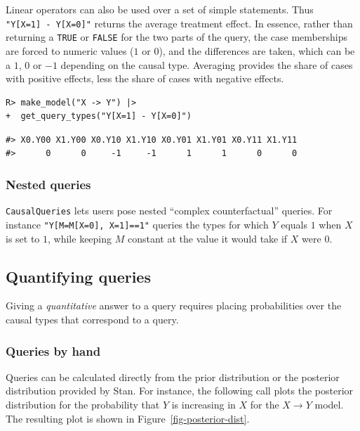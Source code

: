 \documentclass[
  11pt,
  article]{jss}
\begin{document}
Linear operators can also be used over a set of simple statements. Thus
\texttt{"Y{[}X=1{]}\ -\ Y{[}X=0{]}"} returns the average treatment
effect. In essence, rather than returning a \texttt{TRUE} or
\texttt{FALSE} for the two parts of the query, the case memberships are
forced to numeric values (\(1\) or \(0\)), and the differences are
taken, which can be a \(1\), \(0\) or \(-1\) depending on the causal
type. Averaging provides the share of cases with positive effects, less
the share of cases with negative effects.

\begin{verbatim}
R> make_model("X -> Y") |> 
+  get_query_types("Y[X=1] - Y[X=0]")
\end{verbatim}

\begin{verbatim}
#> X0.Y00 X1.Y00 X0.Y10 X1.Y10 X0.Y01 X1.Y01 X0.Y11 X1.Y11 
#>      0      0     -1     -1      1      1      0      0
\end{verbatim}

\subsubsection{Nested queries}\label{nested-queries}

\texttt{CausalQueries} lets users pose nested ``complex counterfactual''
queries. For instance \texttt{"Y{[}M=M{[}X=0{]},\ X=1{]}==1"} queries
the types for which \(Y\) equals \(1\) when \(X\) is set to \(1\), while
keeping \(M\) constant at the value it would take if \(X\) were \(0\).

\subsection{Quantifying queries}\label{quantifying-queries}

Giving a \emph{quantitative} answer to a query requires placing
probabilities over the causal types that correspond to a query.

\subsubsection{Queries by hand}\label{queries-by-hand}

Queries can be calculated directly from the prior distribution or the
posterior distribution provided by Stan. For instance, the following
call plots the posterior distribution for the probability that \(Y\) is
increasing in \(X\) for the \(X \rightarrow Y\) model. The resulting
plot is shown in Figure~\ref{fig-posterior-dist}.
\end{document}
